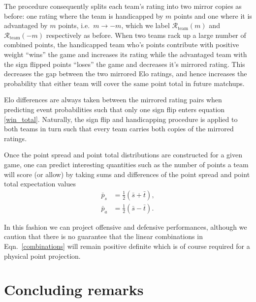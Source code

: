 \documentclass[aps,prc,reprint,amsmath,superscriptaddress]{revtex4-1}
\begin{document}
The procedure consequently splits each team's rating into two mirror copies as before: one rating where the team is handicapped by $m$ points and one where it is advantaged by $m$ points, i.e.\ $m \rightarrow -m$, which we label $\mathcal{R}_\text{team}(m)$ and $\mathcal{R}_\text{team}(-m)$ respectively as before.
When two teams rack up a large number of combined points, the handicapped team who's points contribute with positive weight ``wins'' the game and increases its rating while the advantaged team with the sign flipped points ``loses'' the game and decreases it's mirrored rating.
This decreases the gap between the two mirrored Elo ratings, and hence increases the probability that either team will cover the same point total in future matchups.

Elo differences are always taken between the mirrored rating pairs when predicting event probabilities such that only one sign flip enters equation \eqref{win_total}. 
Naturally, the sign flip and handicapping procedure is applied to both teams in turn such that every team carries both copies of the mirrored ratings. 

Once the point spread and point total distributions are constructed for a given game, one can predict interesting quantities such as the number of points a team will score (or allow) by taking sums and differences of the point spread and point total expectation values
\begin{align}
  \label{combinations}
  \bar{p}_s &= \tfrac{1}{2}(\bar{s} + \bar{t}), \\
  \bar{p}_a &= \tfrac{1}{2}(\bar{s} - \bar{t}).
\end{align}

In this fashion we can project offensive and defensive performances, although we caution that there is no guarantee that the linear combinations in Eqn.~\eqref{combinations} will remain positive definite which is of course required for a physical point projection.


\section{Concluding remarks}
\end{document}
